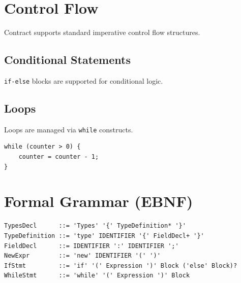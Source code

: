 \documentclass[11pt,a4paper]{article}
\newcommand{\code}[1]{\texttt{\small #1}}
\begin{document}
\section{Control Flow}
Contract supports standard imperative control flow structures.

\subsection{Conditional Statements}
\code{if-else} blocks are supported for conditional logic.

\subsection{Loops}
Loops are managed via \code{while} constructs.

\begin{lstlisting}[style=contract, caption=While loop]
while (counter > 0) {
    counter = counter - 1;
}
\end{lstlisting}

\section{Formal Grammar (EBNF)}
\begin{lstlisting}[basicstyle=\ttfamily\small]
TypesDecl      ::= 'Types' '{' TypeDefinition* '}'
TypeDefinition ::= 'type' IDENTIFIER '{' FieldDecl+ '}'
FieldDecl      ::= IDENTIFIER ':' IDENTIFIER ';'
NewExpr        ::= 'new' IDENTIFIER '(' ')'
IfStmt         ::= 'if' '(' Expression ')' Block ('else' Block)?
WhileStmt      ::= 'while' '(' Expression ')' Block
\end{lstlisting}
\end{document}
